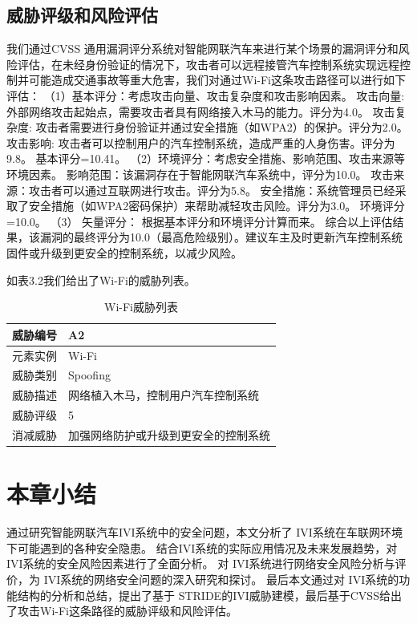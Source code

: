 \subsection{威胁评级和风险评估}
我们通过CVSS 通用漏洞评分系统对智能网联汽车来进行某个场景的漏洞评分和风险评估，在未经身份验证的情况下，攻击者可以远程接管汽车控制系统实现远程控制并可能造成交通事故等重大危害，我们对通过Wi-Fi这条攻击路径可以进行如下评估：
（1）基本评分：考虑攻击向量、攻击复杂度和攻击影响因素。
攻击向量: 外部网络攻击起始点，需要攻击者具有网络接入木马的能力。评分为4.0。
攻击复杂度: 攻击者需要进行身份验证并通过安全措施（如WPA2）的保护。评分为2.0。
攻击影响: 攻击者可以控制用户的汽车控制系统，造成严重的人身伤害。评分为9.8。
基本评分=10.41。
（2）环境评分：考虑安全措施、影响范围、攻击来源等环境因素。
影响范围：该漏洞存在于智能网联汽车系统中，评分为10.0。
攻击来源：攻击者可以通过互联网进行攻击。评分为5.8。
安全措施：系统管理员已经采取了安全措施（如WPA2密码保护）来帮助减轻攻击风险。评分为3.0。
环境评分=10.0。
（3） 矢量评分： 根据基本评分和环境评分计算而来。
综合以上评估结果，该漏洞的最终评分为10.0（最高危险级别）。建议车主及时更新汽车控制系统固件或升级到更安全的控制系统，以减少风险。

如表3.2我们给出了Wi-Fi的威胁列表。
\begin{table}
  \caption{Wi-Fi威胁列表}
\begin{center}
    \begin{tabular}{|l|l}
      \hline 威胁编号 & A2 \\
      \hline 元素实例 & Wi-Fi \\
      \hline 威胁类别 & Spoofing \\
      \hline 威胁描述 & 网络植入木马，控制用户汽车控制系统 \\
      \hline 威胁评级 & 5 \\
      \hline 消减威胁 & 加强网络防护或升级到更安全的控制系统 \\
      \hline
      \end{tabular}
  \end{center}
\end{table}

\section{本章小结}
通过研究智能网联汽车IVI系统中的安全问题，本文分析了 IVI系统在车联网环境下可能遇到的各种安全隐患。
结合IVI系统的实际应用情况及未来发展趋势，对 IVI系统的安全风险因素进行了全面分析。
对 IVI系统进行网络安全风险分析与评价，为 IVI系统的网络安全问题的深入研究和探讨。
最后本文通过对 IVI系统的功能结构的分析和总结，提出了基于 STRIDE的IVI威胁建模，最后基于CVSS给出了攻击Wi-Fi这条路径的威胁评级和风险评估。
